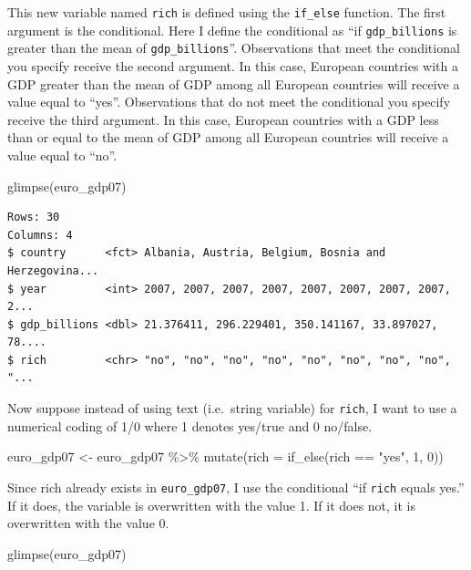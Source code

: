 \documentclass[
]{book}
\makeatletter
\newenvironment{Shaded}{\begin{snugshade}}{\end{snugshade}}
\newcommand{\AttributeTok}[1]{\textcolor[rgb]{0.61,0.61,0.61}{#1}}
\newcommand{\DecValTok}[1]{\textcolor[rgb]{0.06,0.06,0.06}{#1}}
\newcommand{\FunctionTok}[1]{\textcolor[rgb]{0,0,0}{#1}}
\newcommand{\NormalTok}[1]{#1}
\newcommand{\OtherTok}[1]{\textcolor[rgb]{0.37,0.37,0.37}{#1}}
\newcommand{\SpecialCharTok}[1]{\textcolor[rgb]{0,0,0}{#1}}
\newcommand{\StringTok}[1]{\textcolor[rgb]{0.5,0.5,0.5}{#1}}
\newenvironment{kframe}{%
\medskip{}
\setlength{\fboxsep}{.8em}
 \def\at@end@of@kframe{}%
 \ifinner\ifhmode%
  \def\at@end@of@kframe{\end{minipage}}%
  \begin{minipage}{\columnwidth}%
 \fi\fi%
 \def\FrameCommand##1{\hskip\@totalleftmargin \hskip-\fboxsep
 \colorbox{shadecolor}{##1}\hskip-\fboxsep
     \hskip-\linewidth \hskip-\@totalleftmargin \hskip\columnwidth}%
 \MakeFramed {\advance\hsize-\width
   \@totalleftmargin\z@ \linewidth\hsize
   \@setminipage}}%
 {\par\unskip\endMakeFramed%
 \at@end@of@kframe}
\renewenvironment{Shaded}{\begin{kframe}}{\end{kframe}}
\makeatother
\begin{document}
This new variable named \texttt{rich} is defined using the \texttt{if\_else} function. The first argument is the conditional. Here I define the conditional as ``if \texttt{gdp\_billions} is greater than the mean of \texttt{gdp\_billions}''. Observations that meet the conditional you specify receive the second argument. In this case, European countries with a GDP greater than the mean of GDP among all European countries will receive a value equal to ``yes''. Observations that do not meet the conditional you specify receive the third argument. In this case, European countries with a GDP less than or equal to the mean of GDP among all European countries will receive a value equal to ``no''.

\begin{Shaded}
\begin{Highlighting}[]
\FunctionTok{glimpse}\NormalTok{(euro\_gdp07)}
\end{Highlighting}
\end{Shaded}

\begin{verbatim}
Rows: 30
Columns: 4
$ country      <fct> Albania, Austria, Belgium, Bosnia and Herzegovina...
$ year         <int> 2007, 2007, 2007, 2007, 2007, 2007, 2007, 2007, 2...
$ gdp_billions <dbl> 21.376411, 296.229401, 350.141167, 33.897027, 78....
$ rich         <chr> "no", "no", "no", "no", "no", "no", "no", "no", "...
\end{verbatim}

Now suppose instead of using text (i.e.~string variable) for \texttt{rich}, I want to use a numerical coding of 1/0 where 1 denotes yes/true and 0 no/false.

\begin{Shaded}
\begin{Highlighting}[]
\NormalTok{euro\_gdp07 }\OtherTok{\textless{}{-}}\NormalTok{ euro\_gdp07 }\SpecialCharTok{\%\textgreater{}\%} 
  \FunctionTok{mutate}\NormalTok{(}\AttributeTok{rich =} \FunctionTok{if\_else}\NormalTok{(rich }\SpecialCharTok{==} \StringTok{"yes"}\NormalTok{, }\DecValTok{1}\NormalTok{, }\DecValTok{0}\NormalTok{))}
\end{Highlighting}
\end{Shaded}

Since rich already exists in \texttt{euro\_gdp07}, I use the conditional ``if \texttt{rich} equals yes.'' If it does, the variable is overwritten with the value 1. If it does not, it is overwritten with the value 0.

\begin{Shaded}
\begin{Highlighting}[]
\FunctionTok{glimpse}\NormalTok{(euro\_gdp07)}
\end{Highlighting}
\end{Shaded}
\end{document}
